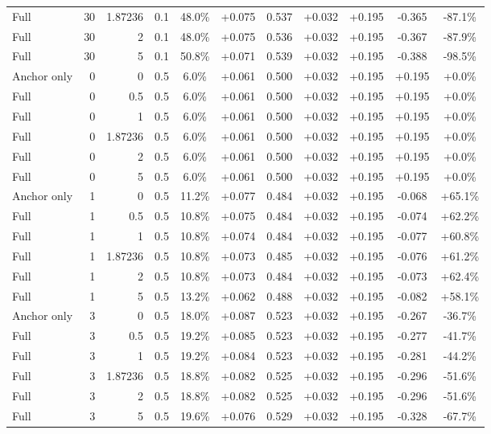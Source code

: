 \begin{table}[htbp]
\begin{tabular}{lrrrccccccc}
Full & 30 & 1.87236 & 0.1 & 48.0\% & +0.075 & 0.537 & +0.032 & +0.195 & -0.365 & -87.1\% \\
Full & 30 & 2 & 0.1 & 48.0\% & +0.075 & 0.536 & +0.032 & +0.195 & -0.367 & -87.9\% \\
Full & 30 & 5 & 0.1 & 50.8\% & +0.071 & 0.539 & +0.032 & +0.195 & -0.388 & -98.5\% \\
Anchor only & 0 & 0 & 0.5 & 6.0\% & +0.061 & 0.500 & +0.032 & +0.195 & +0.195 & +0.0\% \\
Full & 0 & 0.5 & 0.5 & 6.0\% & +0.061 & 0.500 & +0.032 & +0.195 & +0.195 & +0.0\% \\
Full & 0 & 1 & 0.5 & 6.0\% & +0.061 & 0.500 & +0.032 & +0.195 & +0.195 & +0.0\% \\
Full & 0 & 1.87236 & 0.5 & 6.0\% & +0.061 & 0.500 & +0.032 & +0.195 & +0.195 & +0.0\% \\
Full & 0 & 2 & 0.5 & 6.0\% & +0.061 & 0.500 & +0.032 & +0.195 & +0.195 & +0.0\% \\
Full & 0 & 5 & 0.5 & 6.0\% & +0.061 & 0.500 & +0.032 & +0.195 & +0.195 & +0.0\% \\
Anchor only & 1 & 0 & 0.5 & 11.2\% & +0.077 & 0.484 & +0.032 & +0.195 & -0.068 & +65.1\% \\
Full & 1 & 0.5 & 0.5 & 10.8\% & +0.075 & 0.484 & +0.032 & +0.195 & -0.074 & +62.2\% \\
Full & 1 & 1 & 0.5 & 10.8\% & +0.074 & 0.484 & +0.032 & +0.195 & -0.077 & +60.8\% \\
Full & 1 & 1.87236 & 0.5 & 10.8\% & +0.073 & 0.485 & +0.032 & +0.195 & -0.076 & +61.2\% \\
Full & 1 & 2 & 0.5 & 10.8\% & +0.073 & 0.484 & +0.032 & +0.195 & -0.073 & +62.4\% \\
Full & 1 & 5 & 0.5 & 13.2\% & +0.062 & 0.488 & +0.032 & +0.195 & -0.082 & +58.1\% \\
Anchor only & 3 & 0 & 0.5 & 18.0\% & +0.087 & 0.523 & +0.032 & +0.195 & -0.267 & -36.7\% \\
Full & 3 & 0.5 & 0.5 & 19.2\% & +0.085 & 0.523 & +0.032 & +0.195 & -0.277 & -41.7\% \\
Full & 3 & 1 & 0.5 & 19.2\% & +0.084 & 0.523 & +0.032 & +0.195 & -0.281 & -44.2\% \\
Full & 3 & 1.87236 & 0.5 & 18.8\% & +0.082 & 0.525 & +0.032 & +0.195 & -0.296 & -51.6\% \\
Full & 3 & 2 & 0.5 & 18.8\% & +0.082 & 0.525 & +0.032 & +0.195 & -0.296 & -51.6\% \\
Full & 3 & 5 & 0.5 & 19.6\% & +0.076 & 0.529 & +0.032 & +0.195 & -0.328 & -67.7\% \\

\end{tabular}
\end{table}

